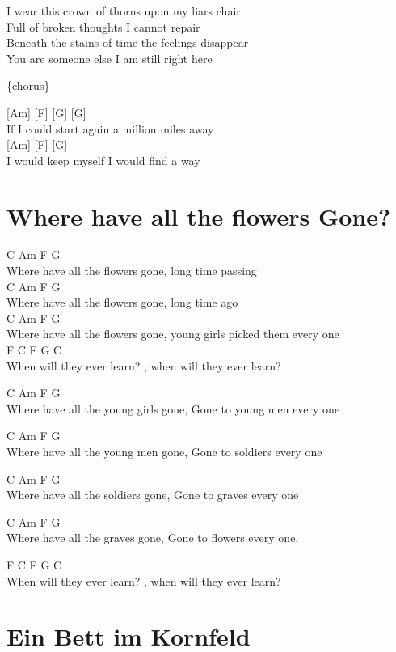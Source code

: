 \documentclass[
  letterpaper,
]{scrbook}
\begin{document}
I wear this crown of thorns upon my liar\textquotesingle s chair\\
Full of broken thoughts I cannot repair\\
Beneath the stains of time the feelings disappear\\
You are someone else I am still right here

\{chorus\}

{[}Am{]} {[}F{]} {[}G{]} {[}G{]}\\
If I could start again a million miles away\\
{[}Am{]} {[}F{]} {[}G{]}\\
I would keep myself I would find a way

\hypertarget{where-have-all-the-flowers-gone}{%
\chapter{Where have all the flowers
Gone?}\label{where-have-all-the-flowers-gone}}

C Am F G\\
Where have all the flowers gone, long time passing\\
C Am F G\\
Where have all the flowers gone, long time ago\\
C Am F G\\
Where have all the flowers gone, young girls picked them every one\\
F C F G C\\
When will they ever learn? , when will they ever learn?

C Am F G\\
Where have all the young girls gone, Gone to young men every one

C Am F G\\
Where have all the young men gone, Gone to soldiers every one

C Am F G\\
Where have all the soldiers gone, Gone to graves every one

C Am F G\\
Where have all the graves gone, Gone to flowers every one.

F C F G C\\
When will they ever learn? , when will they ever learn?

\hypertarget{ein-bett-im-kornfeld}{%
\chapter{Ein Bett im Kornfeld}\label{ein-bett-im-kornfeld}}
\end{document}

